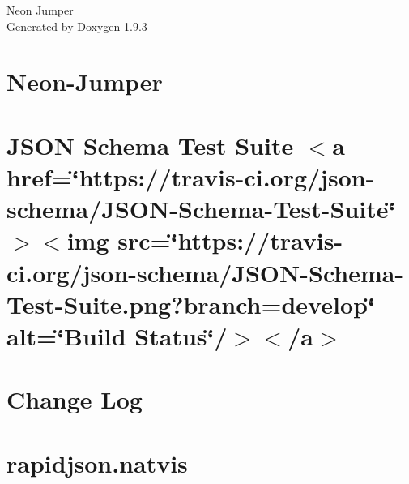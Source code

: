 \documentclass[twoside]{book}
\newcommand{\+}{\discretionary{\mbox{\scriptsize$\hookleftarrow$}}{}{}}
\newcommand{\clearemptydoublepage}{%
    \newpage{\pagestyle{empty}\cleardoublepage}%
  }
\begin{document}
  \raggedbottom
    \hypersetup{pageanchor=false,
                bookmarksnumbered=true,
                pdfencoding=unicode
               }
  \begin{titlepage}
  \vspace*{7cm}
  \begin{center}%
  {\Large Neon Jumper}\\
  \vspace*{1cm}
  {\large Generated by Doxygen 1.9.3}\\
  \end{center}
  \end{titlepage}
  \clearemptydoublepage
  \tableofcontents
  \clearemptydoublepage
  \hypersetup{pageanchor=true}
\chapter{Neon-\/\+Jumper}
\label{md__r_e_a_d_m_e}

\chapter{JSON Schema Test Suite \texorpdfstring{$<$}{<}a href=\char`\"{}https\+://travis-\/ci.\+org/json-\/schema/\+JSON-\/\+Schema-\/\+Test-\/\+Suite\char`\"{} \texorpdfstring{$>$}{>}\texorpdfstring{$<$}{<}img src=\char`\"{}https\+://travis-\/ci.\+org/json-\/schema/\+JSON-\/\+Schema-\/\+Test-\/\+Suite.\+png?branch=develop\char`\"{} alt=\char`\"{}\+Build Status\char`\"{}/\texorpdfstring{$>$}{>}\texorpdfstring{$<$}{<}/a\texorpdfstring{$>$}{>}}
\label{md_src_rapidjson_bin_jsonschema__r_e_a_d_m_e}

\chapter{Change Log}
\label{md_src_rapidjson__c_h_a_n_g_e_l_o_g}

\chapter{rapidjson.\+natvis}
\label{md_src_rapidjson_contrib_natvis__r_e_a_d_m_e}

\end{document}
